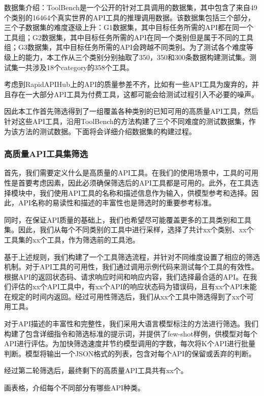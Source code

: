 数据集介绍：ToolBench\cite{Qin2023}是一个公开的针对工具调用的数据集，其中包含了来自49个类别的16464个真实世界的API工具的推理调用数据。该数据集包括三个部分，三个子数据集的难度逐级上升：G1数据集，其中目标任务所需的API都在同一个工具组；G2数据集，其中目标任务所需的API在同一个类别但是属于不同的工具组；G3数据集，其中目标任务所需的API会跨越不同类别。为了测试各个难度等级上的能力，本工作从三个类别分别抽取了350，350和300条数据构建测试集。测试集一共涉及18个category的358个工具。

考虑到RapidAPIHub上的API的质量参差不齐，比如有一些API工具为废弃的，并且存在一大部分API工具为付费工具，这都可能会给测试过程引入不必要的噪声。

因此本工作首先筛选得到了一组覆盖各种类别的已知可用的高质量API工具，然后针对这些API工具，沿用ToolBench的方法构建了三个不同难度的测试数据集，作为该方法的测试数据。下面将会详细介绍数据集的构建过程。

\subsubsection{高质量API工具集筛选}

首先，我们需要定义什么是高质量的API工具。在我们的使用场景中，工具的可用性是首要考虑因素，因此必须确保筛选后的API工具都是可用的。此外，在工具选择模块中，我们使用API工具的名称和描述信息作为输入，供模型参考和选择。因此，API名称的易读性和描述的丰富性也是筛选时的重要参考标准。

同时，在保证API质量的基础上，我们也希望尽可能覆盖更多的工具类别和工具集。因此，我们从每个不同类别的工具中进行采样，选择了共计xx个类别、xx个工具集的xx个工具，作为筛选前的工具池。

基于上述规则，我们构建了一个工具筛选流程，并针对不同维度设置了相应的筛选机制。对于API工具的可用性，我们通过调用示例代码来测试每个工具的有效性。根据API的返回状态码、请求响应时间和响应内容，我们选择最合适的API。在我们评估的xx个API工具中，有xx个API的响应状态码为错误码，且有xx个API未能在规定的时间内返回。经过可用性筛选后，我们从xx个工具中筛选得到了xx个可用工具。

对于API描述的丰富性和完整性，我们采用大语言模型标注的方法进行筛选。我们构建了包含详细指令和筛选标准的提示词，并提供了few-shot样例，供模型对每个API进行评估。为加快筛选速度并节约模型调用的字数，每次将K个API进行批量判断。模型将输出一个JSON格式的列表，包含对每个API的保留或丢弃的判断。

经过第二轮筛选后，最终剩下的高质量API工具共有xx个。

画表格，介绍每个不同部分有哪些API种类。

